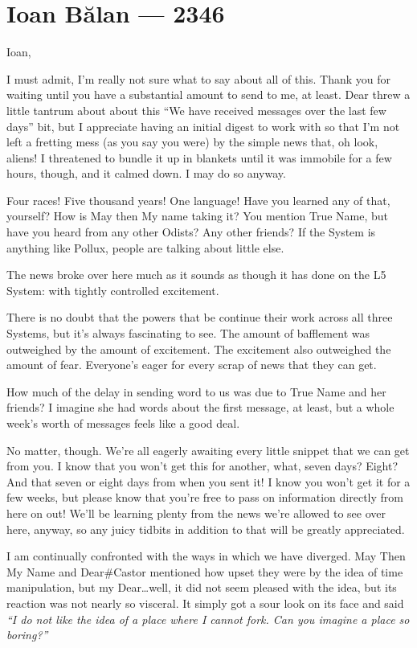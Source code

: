 \hypertarget{ioan-bux103lan-2346}{%
\chapter{Ioan Bălan — 2346}\label{ioan-bux103lan-2346}}

Ioan,

I must admit, I'm really not sure what to say about all of this. Thank you for waiting until you have a substantial amount to send to me, at least. Dear threw a little tantrum about about this ``We have received messages over the last few days'' bit, but I appreciate having an initial digest to work with so that I'm not left a fretting mess (as you say you were) by the simple news that, oh look, aliens! I threatened to bundle it up in blankets until it was immobile for a few hours, though, and it calmed down. I may do so anyway.

Four races! Five thousand years! One language! Have you learned any of that, yourself? How is May then My name taking it? You mention True Name, but have you heard from any other Odists? Any other friends? If the System is anything like Pollux, people are talking about little else.

The news broke over here much as it sounds as though it has done on the L5 System: with tightly controlled excitement.

There is no doubt that the powers that be continue their work across all three Systems, but it's always fascinating to see. The amount of bafflement was outweighed by the amount of excitement. The excitement also outweighed the amount of fear. Everyone's eager for every scrap of news that they can get.

How much of the delay in sending word to us was due to True Name and her friends? I imagine she had words about the first message, at least, but a whole week's worth of messages feels like a good deal.

No matter, though. We're all eagerly awaiting every little snippet that we can get from you. I know that you won't get this for another, what, seven days? Eight? And that seven or eight days from when you sent it! I know you won't get it for a few weeks, but please know that you're free to pass on information directly from here on out! We'll be learning plenty from the news we're allowed to see over here, anyway, so any juicy tidbits in addition to that will be greatly appreciated.

I am continually confronted with the ways in which we have diverged. May Then My Name and Dear\#Castor mentioned how upset they were by the idea of time manipulation, but my Dear\ldots well, it did not seem pleased with the idea, but its reaction was not nearly so visceral. It simply got a sour look on its face and said \emph{``I do not like the idea of a place where I cannot fork. Can you imagine a place so boring?''}

